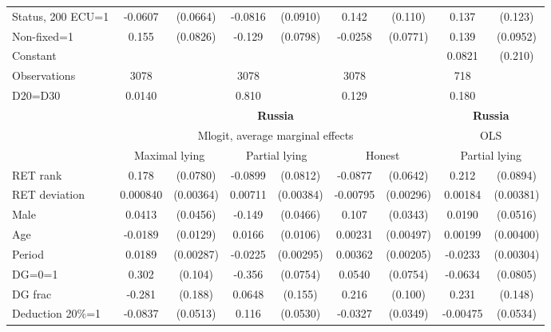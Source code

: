 \begin{tabular}{l|cccccc|cc}
Status, 200 ECU=1&  -0.0607         & (0.0664)&  -0.0816         & (0.0910)&    0.142         &  (0.110)&    0.137         &  (0.123)\\
Non-fixed=1     &    0.155\sym{*}  & (0.0826)&   -0.129         & (0.0798)&  -0.0258         & (0.0771)&    0.139         & (0.0952)\\
Constant        &                  &         &                  &         &                  &         &   0.0821         &  (0.210)\\
\hline
Observations    &     3078         &         &     3078         &         &     3078         &         &      718         &         \\
D20=D30         &   0.0140         &         &    0.810         &         &    0.129         &         &    0.180         &         \\
\hline\hline
&\multicolumn{6}{c|}{\bf Russia}&\multicolumn{2}{c}{\bf Russia}\\ &\multicolumn{6}{c|}{Mlogit, average marginal effects }&\multicolumn{2}{c}{OLS}\\
                &\multicolumn{2}{c}{Maximal lying}&\multicolumn{2}{c}{Partial lying}&\multicolumn{2}{c}{Honest}  &\multicolumn{2}{c}{Partial lying}\\
\hline
RET rank        &    0.178\sym{**} & (0.0780)&  -0.0899         & (0.0812)&  -0.0877         & (0.0642)&    0.212\sym{**} & (0.0894)\\
RET deviation   & 0.000840         &(0.00364)&  0.00711\sym{*}  &(0.00384)& -0.00795\sym{***}&(0.00296)&  0.00184         &(0.00381)\\
Male            &   0.0413         & (0.0456)&   -0.149\sym{***}& (0.0466)&    0.107\sym{***}& (0.0343)&   0.0190         & (0.0516)\\
Age             &  -0.0189         & (0.0129)&   0.0166         & (0.0106)&  0.00231         &(0.00497)&  0.00199         &(0.00400)\\
Period          &   0.0189\sym{***}&(0.00287)&  -0.0225\sym{***}&(0.00295)&  0.00362\sym{*}  &(0.00205)&  -0.0233\sym{***}&(0.00304)\\
DG=0=1          &    0.302\sym{***}&  (0.104)&   -0.356\sym{***}& (0.0754)&   0.0540         & (0.0754)&  -0.0634         & (0.0805)\\
DG frac         &   -0.281         &  (0.188)&   0.0648         &  (0.155)&    0.216\sym{**} &  (0.100)&    0.231         &  (0.148)\\
Deduction 20\%=1&  -0.0837         & (0.0513)&    0.116\sym{**} & (0.0530)&  -0.0327         & (0.0349)& -0.00475         & (0.0534)\\

\end{tabular}
